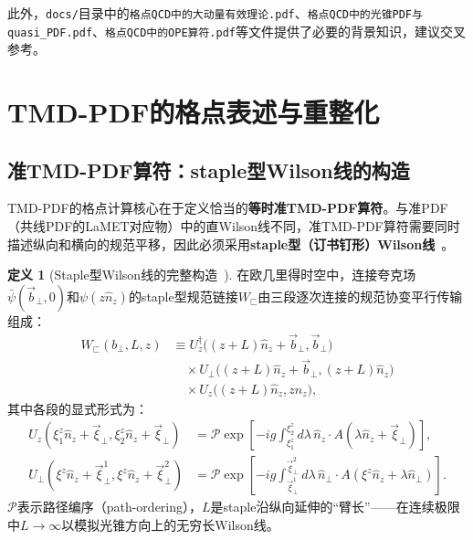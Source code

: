 \documentclass[12pt,a4paper]{ctexart}
\theoremstyle{definition}
\newtheorem{definition}{定义}[section]
\begin{document}
此外，\texttt{docs/}目录中的\verb|格点QCD中的大动量有效理论.pdf|、\verb|格点QCD中的光锥PDF与quasi_PDF.pdf|、\verb|格点QCD中的OPE算符.pdf|等文件提供了必要的背景知识，建议交叉参考。

\section{TMD-PDF的格点表述与重整化}

\subsection{准TMD-PDF算符：staple型Wilson线的构造}

TMD-PDF的格点计算核心在于定义恰当的\textbf{等时准TMD-PDF算符}。与准PDF（共线PDF的LaMET对应物）中的直Wilson线不同，准TMD-PDF算符需要同时描述纵向和横向的规范平移，因此必须采用\textbf{staple型（订书钉形）Wilson线}~\cite{He2024unpolTMD,Zhang2022renormTMD,Ji2013Euclidean}。

\begin{definition}[Staple型Wilson线的完整构造~\cite{Zhang2022renormTMD}]
在欧几里得时空中，连接夸克场$\bar\psi(\vec{b}_\perp, 0)$和$\psi(z\hat{n}_z)$的staple型规范链接$W_{\sqsubset}$由三段逐次连接的规范协变平行传输组成：
\begin{equation}
\begin{aligned}
W_{\sqsubset}(b_\perp, L, z) &\equiv U_z^\dagger\big((z+L)\hat{n}_z + \vec{b}_\perp, \vec{b}_\perp\big) \\
&\quad \times U_\perp\big((z+L)\hat{n}_z + \vec{b}_\perp, (z+L)\hat{n}_z\big) \\
&\quad \times U_z\big((z+L)\hat{n}_z, z\hat{n}_z\big),
\end{aligned}
\label{eq:staple_Wilson_full}
\end{equation}
其中各段的显式形式为：
\begin{align}
U_z(\xi_1^z \hat{n}_z + \vec{\xi}_\perp, \xi_2^z \hat{n}_z + \vec{\xi}_\perp) &= \mathcal{P}\exp\left[-ig\int_{\xi_1^z}^{\xi_2^z} d\lambda\, \hat{n}_z \cdot A(\lambda\hat{n}_z + \vec{\xi}_\perp)\right], \label{eq:Uz} \\
U_\perp(\xi^z \hat{n}_z + \vec{\xi}_\perp^1, \xi^z \hat{n}_z + \vec{\xi}_\perp^2) &= \mathcal{P}\exp\left[-ig\int_{\vec{\xi}_\perp^1}^{\vec{\xi}_\perp^2} d\lambda\, \hat{n}_\perp \cdot A(\xi^z\hat{n}_z + \lambda\hat{n}_\perp)\right]. \label{eq:Uperp}
\end{align}
$\mathcal{P}$表示路径编序（path-ordering），$L$是staple沿纵向延伸的``臂长''——在连续极限中$L\to\infty$以模拟光锥方向上的无穷长Wilson线。
\end{definition}
\end{document}
